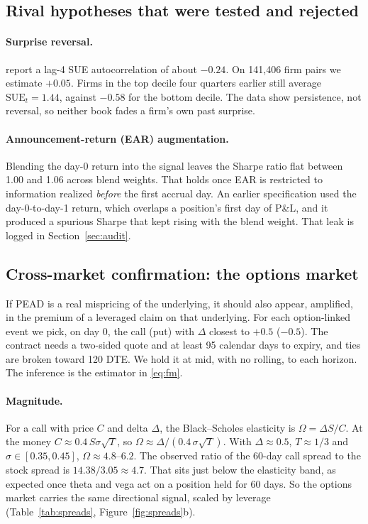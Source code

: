 \documentclass[11pt]{article}
\theoremstyle{definition}
\newcommand{\1}{\mathbf{1}}
\begin{document}
\subsection{Rival hypotheses that were tested and rejected}

\paragraph{Surprise reversal.} \citet{BernardThomas1990} report a lag-4 SUE
autocorrelation of about $-0.24$. On 141{,}406 firm pairs we estimate $+0.05$. Firms in
the top decile four quarters earlier still average $\mathrm{SUE}_t=1.44$, against $-0.58$
for the bottom decile. The data show persistence, not reversal, so neither book fades a
firm's own past surprise.

\paragraph{Announcement-return (EAR) augmentation.} Blending the day-0 return into the
signal leaves the Sharpe ratio flat between 1.00 and 1.06 across blend weights. That holds
once EAR is restricted to information realized \emph{before} the first accrual day. An
earlier specification used the day-0-to-day-1 return, which overlaps a position's first day
of P\&L, and it produced a spurious Sharpe that kept rising with the blend weight. That
leak is logged in Section~\ref{sec:audit}.

\subsection{Cross-market confirmation: the options market}

If PEAD is a real mispricing of the underlying, it should also appear, amplified, in the
premium of a leveraged claim on that underlying. For each option-linked event we pick, on
day 0, the call (put) with $\Delta$ closest to $+0.5$ ($-0.5$). The contract needs a
two-sided quote and at least 95 calendar days to expiry, and ties are broken toward 120 DTE.
We hold it at mid, with no rolling, to each horizon. The inference is the estimator in
\eqref{eq:fm}.

\paragraph{Magnitude.} For a call with price $C$ and delta $\Delta$, the Black--Scholes
elasticity is $\Omega=\Delta S/C$. At the money $C\approx 0.4\,S\sigma\sqrt T$, so
$\Omega\approx\Delta/(0.4\,\sigma\sqrt T)$. With $\Delta\approx 0.5$, $T\approx 1/3$ and
$\sigma\in[0.35,0.45]$, $\Omega\approx 4.8$--$6.2$. The observed ratio of the 60-day call
spread to the stock spread is $14.38/3.05\approx 4.7$. That sits just below the elasticity
band, as expected once theta and vega act on a position held for 60 days. So the options
market carries the same directional signal, scaled by leverage (Table~\ref{tab:spreads},
Figure~\ref{fig:spreads}b).
\end{document}
